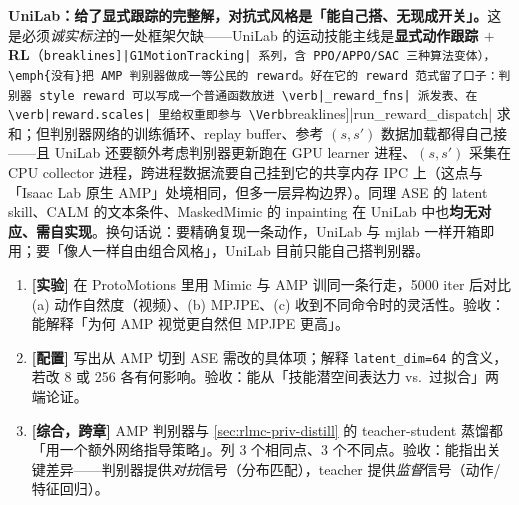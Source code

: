 \textbf{UniLab：给了显式跟踪的完整解，对抗式风格是「能自己搭、无现成开关」。}这是必须\emph{诚实标注}的一处框架欠缺——UniLab 的运动技能主线是\textbf{显式动作跟踪 $+$ RL}（\Verb[breaklines]|G1MotionTracking| 系列，含 PPO/APPO/SAC 三种算法变体），\emph{没有}把 AMP 判别器做成一等公民的 reward。好在它的 reward 范式留了口子：判别器 style reward 可以写成一个普通函数放进 \verb|_reward_fns| 派发表、在 \verb|reward.scales| 里给权重即参与 \Verb[breaklines]|run_reward_dispatch| 求和；但判别器网络的训练循环、replay buffer、参考 $(s,s')$ 数据加载都得自己接——且 UniLab 还要额外考虑判别器更新跑在 GPU learner 进程、$(s,s')$ 采集在 CPU collector 进程，跨进程数据流要自己挂到它的共享内存 IPC 上（这点与「Isaac Lab 原生 AMP」处境相同，但多一层异构边界）。同理 ASE 的 latent skill、CALM 的文本条件、MaskedMimic 的 inpainting 在 UniLab 中也\textbf{均无对应、需自实现}。换句话说：要精确复现一条动作，UniLab 与 mjlab 一样开箱即用；要「像人一样自由组合风格」，UniLab 目前只能自己搭判别器。


\begin{practice}[本节练习]
\begin{enumerate}
  \item \textbf{[实验]} 在 ProtoMotions 里用 Mimic 与 AMP 训同一条行走，5000 iter 后对比 (a) 动作自然度（视频）、(b) MPJPE、(c) 收到不同命令时的灵活性。验收：能解释「为何 AMP 视觉更自然但 MPJPE 更高」。
  \item \textbf{[配置]} 写出从 AMP 切到 ASE 需改的具体项；解释 \verb|latent_dim=64| 的含义，若改 8 或 256 各有何影响。验收：能从「技能潜空间表达力 vs.\ 过拟合」两端论证。
  \item \textbf{[综合，跨章]} AMP 判别器与 \cref{sec:rlmc-priv-distill} 的 teacher-student 蒸馏都「用一个额外网络指导策略」。列 3 个相同点、3 个不同点。验收：能指出关键差异——判别器提供\emph{对抗}信号（分布匹配），teacher 提供\emph{监督}信号（动作/特征回归）。
\end{enumerate}
\end{practice}

